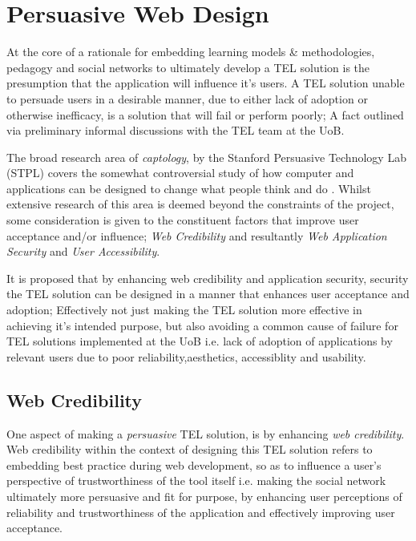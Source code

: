  
\section{Persuasive Web Design}

At the core of a rationale for embedding  learning models \& methodologies, pedagogy and social networks to ultimately develop a TEL solution is the presumption that the application will influence it's users. A TEL solution unable to persuade users in a desirable manner, due to either lack of adoption or otherwise inefficacy, is a solution that will fail or perform poorly; A fact outlined via preliminary informal discussions with the TEL team at the UoB.

The broad research area of \textit{captology}, by the Stanford Persuasive Technology Lab (STPL) covers the somewhat controversial study of  how computer and applications can be designed to change what people think and do \cite{Fogg2002a,Fogg2002,Fogg2001,Fogg1999}. Whilst extensive research of this area is deemed beyond the constraints of the project, some consideration is given to the constituent factors that improve user acceptance and/or influence; \textit{Web Credibility} and resultantly \textit{Web Application Security} and \textit{User Accessibility}.

It is proposed that by enhancing web credibility and application security, security the TEL solution can be designed in a manner that enhances user acceptance and adoption; Effectively not just making the TEL solution more effective in achieving it's intended purpose, but also avoiding a common cause of failure for TEL solutions implemented at the UoB i.e. lack of adoption of applications by relevant users due to poor reliability,aesthetics, accessiblity and usability.








\subsection{Web Credibility}

One aspect of making a \textit{persuasive} TEL solution, is by enhancing \textit{web credibility}. Web credibility within the context of designing this TEL solution refers to embedding best practice during web development, so as to influence a user's perspective of trustworthiness of the tool itself \cite{Fogg2001,Fogg2002} i.e. making the social network ultimately more persuasive and fit for purpose, by enhancing user perceptions of reliability and trustworthiness of the application \cite{Fogg2001} and effectively improving user acceptance.


